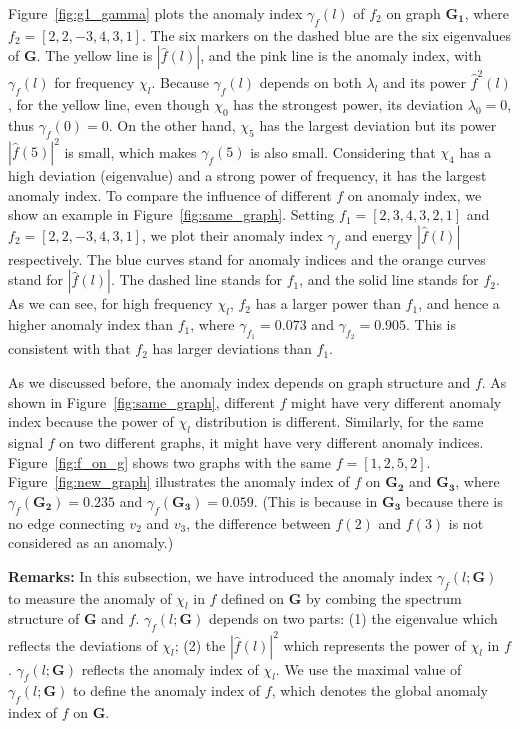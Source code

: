 Figure~\ref{fig:g1_gamma} plots the anomaly index $\gamma_f(l)$ of $f_2$ on graph $\mathbf{G_1}$, where $f_2=[2,2,-3,4,3,1]$. The six markers on the dashed blue are the six eigenvalues of $\mathbf{G}$. The yellow line is $|\hat{f}(l)|$, and the pink line is the anomaly index, with $\gamma_f(l)$ for frequency $\chi_l$. Because $\gamma_f(l)$ depends on both $\lambda_l$ and its power $\hat{f}^2(l)$, for the yellow line, even though $\chi_0$ has the strongest power, its deviation $\lambda_0 = 0$, thus $\gamma_f(0)=0$. On the other hand, $\chi_5$ has the largest deviation but its power $|\hat{f}(5)|^2$ is small, which makes $\gamma_f(5)$ is also small. Considering that $\chi_4$ has a high deviation (eigenvalue) and a strong power of frequency, it has the largest anomaly index. To compare the influence of different $f$ on anomaly index, we show an example in Figure~\ref{fig:same_graph}. Setting $f_1=[2,3,4,3,2,1]$ and $f_2=[2,2,-3,4,3,1]$, we plot their anomaly index $\gamma_{f}$ and energy $|\hat{f}(l)|$ respectively.
The blue curves stand for anomaly indices and the
orange curves stand for $|\hat{f}(l)|$. The dashed line stands for $f_1$, and the solid line stands for $f_2$. As we can see, for high frequency $\chi_l$, $f_2$ has a larger power than $f_1$, and hence a higher anomaly index than $f_1$, where $\gamma_{f_1}=0.073$ and $\gamma_{f_2}=0.905$. This is consistent with that $f_2$ has larger deviations than $f_1$.

As we discussed before, the anomaly index depends on graph structure and $f$. As shown in Figure~\ref{fig:same_graph}, different $f$ might have very different anomaly index because the power of $\chi_l$ distribution is different. Similarly, for the same signal $f$ on two different graphs, it might have very different anomaly indices. Figure~\ref{fig:f_on_g} shows two graphs with the same $f=[1,2,5,2]$. Figure~\ref{fig:new_graph} illustrates the anomaly index of $f$ on $\mathbf{G_2}$ and $\mathbf{G_3}$, where $\gamma_{f}(\mathbf{G_2})=0.235$ and $\gamma_{f}(\mathbf{G_3})=0.059$. (This is because in $\mathbf{G_3}$ because there is no edge connecting $v_2$ and $v_3$, the difference between $f(2)$ and $f(3)$ is not considered as an anomaly.)


{\textbf{Remarks:}}
In this subsection, we have introduced the anomaly index $\gamma_f(l;\mathbf{G})$ to measure the anomaly of $\chi_l$ in $f$ defined on $\mathbf{G}$ by combing the spectrum structure of $\mathbf{G}$ and $f$. $\gamma_f(l;\mathbf{G})$ depends on two parts: (1) the eigenvalue which reflects the deviations of $\chi_l$; (2) the $|\hat{f}(l)|^2$  which represents the power of $\chi_l$ in $f$. $\gamma_f(l;\mathbf{G})$ reflects the anomaly index of $\chi_l$. We use the maximal value of $\gamma_f(l;\mathbf{G})$ to define the anomaly index of $f$, which denotes the global anomaly index of $f$ on $\mathbf{G}$.



